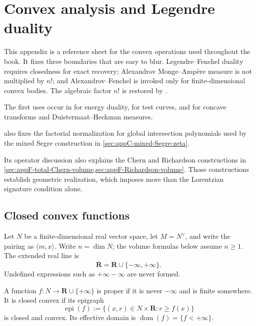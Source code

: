 \chapter{Convex analysis and Legendre duality}
\label{app:convexity}

This appendix is a reference sheet for the convex operations used throughout
the book.
It fixes three boundaries that are easy to blur.
Legendre--Fenchel duality requires closedness for exact recovery;
Alexandrov Monge--Amp\`ere measure is not multiplied by \(n!\);
and Alexandrov--Fenchel is invoked only for finite-dimensional convex bodies.
The algebraic factor \(n!\) is restored by
.

The first uses occur in  for energy
duality,  for test curves, and
 for concave transforms and
Duistermaat--Heckman measures.

 also fixes the
factorial normalization for global intersection polynomials
used by the mixed Segre construction in
\cref{sec:appC-mixed-Segre-zeta}.

Its operator discussion also explains the Chern and Richardson
constructions in \cref{sec:appF-total-Chern-volume,sec:appF-Richardson-volume}.
Those constructions establish geometric realization, which imposes
more than the Lorentzian signature condition alone.

\section{Closed convex functions}
\label{sec:appD-closed-convex}

Let \(N\) be a finite-dimensional real vector space, let
\(M=N^\vee\), and write the pairing as \(\langle m,x\rangle\).
Write \(n=\dim N\); the volume formulas below assume \(n\geq1\).
The extended real line is
\[
 \overline{\mathbf R}=\mathbf R\cup\{-\infty,+\infty\}.
\]
Undefined expressions such as \(+\infty-\infty\) are never formed.

\begin{definition}
\label{def:appD-proper-closed}
A function \(f:N\to\mathbf R\cup\{+\infty\}\) is proper if it is never
\(-\infty\) and is finite somewhere.
It is closed convex if its epigraph
\[
 \operatorname{epi}(f)
 :=\{(x,r)\in N\times\mathbf R:r\geq f(x)\}
\tag{D.1}\label{eq:appD-epigraph}
\]
is closed and convex.
Its effective domain is
\(\operatorname{dom}(f)=\{f<+\infty\}\).
\end{definition}

